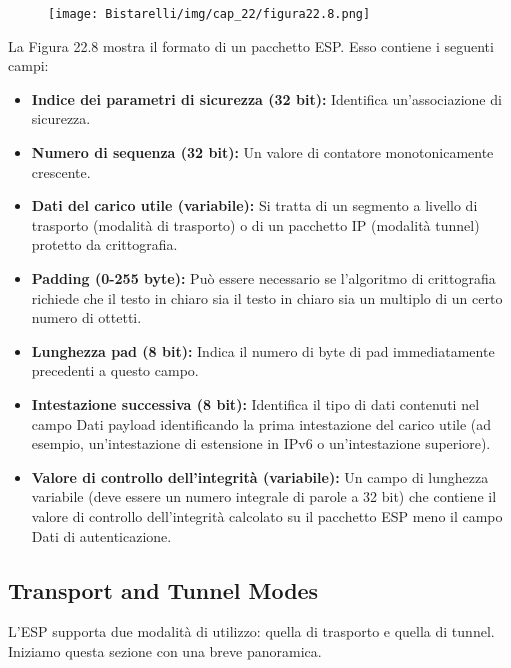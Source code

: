 \begin{figure}[H]
	\centering
    \texttt{[image: Bistarelli/img/cap\_22/figura22.8.png]}
\end{figure}

La Figura 22.8 mostra il formato di un pacchetto ESP. Esso contiene i seguenti campi:
\begin{itemize}
    \item \textbf{Indice dei parametri di sicurezza (32 bit):} Identifica un'associazione di sicurezza.
    
    \item \textbf{Numero di sequenza (32 bit):} Un valore di contatore monotonicamente crescente.
    
    \item \textbf{Dati del carico utile (variabile):} Si tratta di un segmento a livello di trasporto (modalità di trasporto) o di un pacchetto IP (modalità tunnel) protetto da crittografia.
    
    \item\textbf{Padding (0-255 byte):} Può essere necessario se l'algoritmo di crittografia richiede che il testo in chiaro sia il testo in chiaro sia un multiplo di un certo numero di ottetti.
    
    \item \textbf{Lunghezza pad (8 bit):} Indica il numero di byte di pad immediatamente precedenti a questo campo.
    
    \item \textbf{Intestazione successiva (8 bit):} Identifica il tipo di dati contenuti nel campo Dati payload identificando la prima intestazione del carico utile (ad esempio, un'intestazione di estensione in IPv6 o un'intestazione superiore).
    
    \item \textbf{Valore di controllo dell'integrità (variabile):} Un campo di lunghezza variabile (deve essere un numero integrale di parole a 32 bit) che contiene il valore di controllo dell'integrità calcolato su il pacchetto ESP meno il campo Dati di autenticazione.
\end{itemize}

\subsection{Transport and Tunnel Modes}
L'ESP supporta due modalità di utilizzo: quella di trasporto e quella di tunnel. Iniziamo questa sezione con una breve panoramica.

